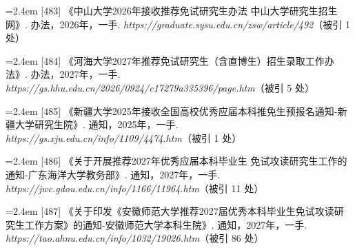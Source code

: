 {\vspace{0.6pt}
\vspace{3.5pt}\par
\nopagebreak\vspace{1pt}
\noindent\hangindent=2.4em \label{src:S0641}{\color{cAccent}[483]} 《中山大学2026年接收推荐免试研究生办法 \textbar{} 中山大学研究生招生网》. 办法，2026年，一手. \textit{https://graduate.sysu.edu.cn/zsw/article/492}（被引 1 处）\par
\vspace{0.6pt}
\vspace{3.5pt}\par
\nopagebreak\vspace{1pt}
\noindent\hangindent=2.4em \label{src:S0643}{\color{cAccent}[484]} 《河海大学2027年推荐免试研究生（含直博生）招生录取工作办法》. 办法，2027年，一手. \textit{https://gs.hhu.edu.cn/2026/0924/c17279a335396/page.htm}（被引 5 处）\par
\vspace{0.6pt}
\vspace{3.5pt}\par
\nopagebreak\vspace{1pt}
\noindent\hangindent=2.4em \label{src:S0644}{\color{cAccent}[485]} 《新疆大学2025年接收全国高校优秀应届本科推免生预报名通知-新疆大学研究生院》. 通知，2025年，一手. \textit{https://gs.xju.edu.cn/info/1109/4474.htm}（被引 1 处）\par
\vspace{0.6pt}
\vspace{3.5pt}\par
\nopagebreak\vspace{1pt}
\noindent\hangindent=2.4em \label{src:S0645}{\color{cAccent}[486]} 《关于开展推荐2027年优秀应届本科毕业生 免试攻读研究生工作的通知-广东海洋大学教务部》. 通知，2027年，一手. \textit{https://jwc.gdou.edu.cn/info/1166/11964.htm}（被引 11 处）\par
\vspace{0.6pt}
\vspace{3.5pt}\par
\nopagebreak\vspace{1pt}
\noindent\hangindent=2.4em \label{src:S0646}{\color{cAccent}[487]} 《关于印发《安徽师范大学推荐2027届优秀本科毕业生免试攻读研究生工作方案》的通知-安徽师范大学本科生院》. 通知，2027年，一手. \textit{https://tao.ahnu.edu.cn/info/1032/19026.htm}（被引 86 处）\par
}
